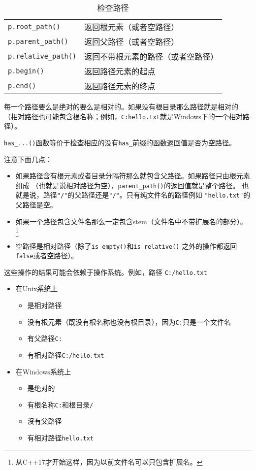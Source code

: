 \begin{table}[htb]
\begin{tabular}{l|l}
        \texttt{p.root\_path()}           & 返回根元素（或者空路径）                \\
        \texttt{p.parent\_path()}         & 返回父路径（或者空路径）                \\
        \texttt{p.relative\_path()}       & 返回不带根元素的路径（或者空路径）           \\
        \texttt{p.begin()}                & 返回路径元素的起点                   \\
        \texttt{p.end()}                  & 返回路径元素的终点                   \\
        \hline
    \end{tabular}
    \caption{检查路径}
    \label{t20.4}
\end{table}

每一个路径要么是绝对的要么是相对的。如果没有根目录那么路径就是相对的
（相对路径也可能包含根名称；例如，\texttt{C:hello.txt}就是Windows下的一个相对路径）。

\texttt{has\_...()}函数等价于检查相应的没有\texttt{has\_}前缀的函数返回值是否为空路径。

注意下面几点：
\begin{itemize}
    \item 如果路径含有根元素或者目录分隔符那么就包含父路径。如果路径只由根元素组成
    （也就是说相对路径为空），\texttt{parent\_path()}的返回值就是整个路径。
    也就是说，路径\texttt{"/"}的父路径还是\texttt{"/"}。只有纯文件名的路径例如
    \texttt{"hello.txt"}的父路径是空。
    \item 如果一个路径包含文件名那么一定包含stem（文件名中不带扩展名的部分）。
    \footnote{从C++17才开始这样，因为以前文件名可以只包含扩展名。}
    \item 空路径是相对路径（除了\texttt{is\_empty()}和\texttt{is\_relative()}
    之外的操作都返回\texttt{false}或者空路径）。
\end{itemize}
这些操作的结果可能会依赖于操作系统。例如，路径
\texttt{C:/hello.txt}
\begin{itemize}
    \item 在Unix系统上
    \begin{itemize}
        \item 是相对路径
        \item 没有根元素（既没有根名称也没有根目录），因为\texttt{C:}只是一个文件名
        \item 有父路径\texttt{C:}
        \item 有相对路径\texttt{C:/hello.txt}
    \end{itemize}
    \item 在Windows系统上
    \begin{itemize}
        \item 是绝对的
        \item 有根名称\texttt{C:}和根目录\texttt{/}
        \item 沒有父路径
        \item 有相对路径\texttt{hello.txt}
    \end{itemize}
\end{itemize}

